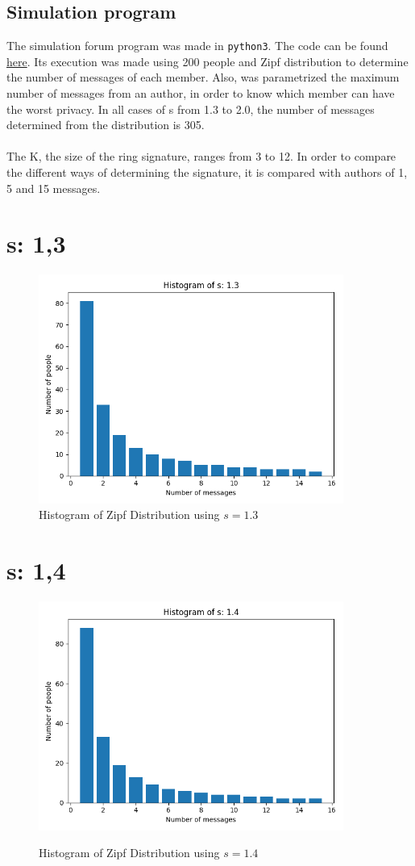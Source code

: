 \documentclass{article}
\begin{document}
\subsection{Simulation program}
The simulation forum program was made in \texttt{python3}. The code can be found \href{https://github.com/sergisi/glowing-dollop}{here}. Its execution was made using 200 people and Zipf distribution to determine the number of messages of each member. Also, was parametrized the maximum number of messages from an author, in order to know which member can have the worst privacy. In all cases of s from 1.3 to 2.0, the number of messages determined from the distribution is 305.
\\
\\
The K, the size of the ring signature, ranges from 3 to 12. In order to compare the different ways of determining the signature, it is compared with authors of 1, 5 and 15 messages.
\section{s: 1,3}
\begin{figure}[H] 
	\centering
	\includegraphics[width=10cm]{imgs/histogram-13.png}
	\caption{Histogram of Zipf Distribution using $s=1.3$}
	\label{fig:hist-13}
  \end{figure}


\section{s: 1,4}
\begin{figure}[H] \centering
 \includegraphics[width=10cm]{imgs/histogram-14.png}
 \label{fig:hist-14}
 \caption{Histogram of Zipf Distribution using $s=1.4$} \end{figure}


\end{document}
